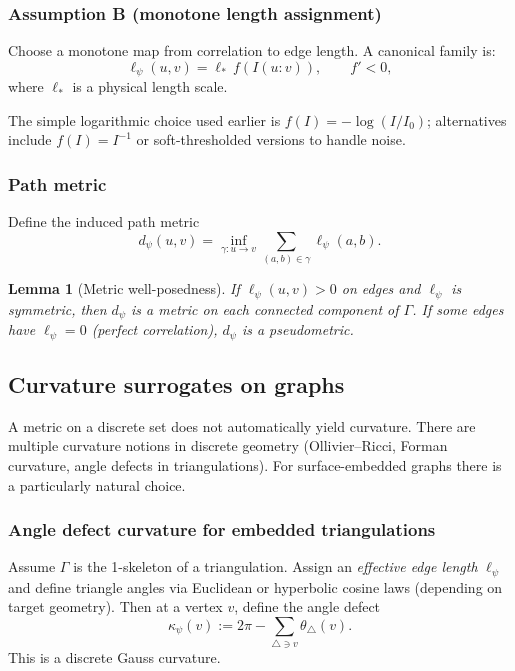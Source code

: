 \documentclass[11pt,oneside]{amsbook}
\numberwithin{equation}{section}
\theoremstyle{plain}
\newtheorem{lemma}[theorem]{Lemma}
\theoremstyle{definition}
\theoremstyle{remark}
\begin{document}
\subsubsection{Assumption B (monotone length assignment)}
Choose a monotone map from correlation to edge length.
A canonical family is:
\begin{equation}
\label{eq:length_from_I}
\ell_\psi(u,v) = \ell_*\, f\!\left(I(u\!:\!v)\right),\qquad f' < 0,
\end{equation}
where $\ell_*$ is a physical length scale.

The simple logarithmic choice used earlier is $f(I)=-\log(I/I_0)$; alternatives include $f(I)=I^{-1}$ or soft-thresholded versions to handle noise.

\subsubsection{Path metric}
Define the induced path metric
\[
d_\psi(u,v)=\inf_{\gamma:u\to v}\sum_{(a,b)\in\gamma}\ell_\psi(a,b).
\]

\begin{lemma}[Metric well-posedness]
If $\ell_\psi(u,v)>0$ on edges and $\ell_\psi$ is symmetric, then $d_\psi$ is a metric on each connected component of $\Gamma$.
If some edges have $\ell_\psi=0$ (perfect correlation), $d_\psi$ is a pseudometric.
\end{lemma}

\subsection{Curvature surrogates on graphs}
\label{sec:curvature_graph}

A metric on a discrete set does not automatically yield curvature.
There are multiple curvature notions in discrete geometry (Ollivier--Ricci, Forman curvature, angle defects in triangulations).
For surface-embedded graphs there is a particularly natural choice.

\subsubsection{Angle defect curvature for embedded triangulations}
Assume $\Gamma$ is the 1-skeleton of a triangulation.
Assign an \emph{effective edge length} $\ell_\psi$ and define triangle angles via Euclidean or hyperbolic cosine laws (depending on target geometry).
Then at a vertex $v$, define the angle defect
\[
\kappa_\psi(v) := 2\pi - \sum_{\triangle\ni v} \theta_\triangle(v).
\]
This is a discrete Gauss curvature.
\end{document}
